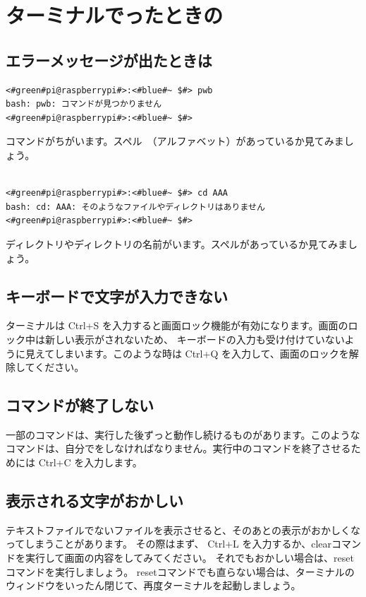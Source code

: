 \documentclass[text03.tex]{subfiles}
\begin{document}
\newpage
\section{ターミナルでったときの}

\subsection{エラーメッセージが出たときは}
\begin{lstlisting}[caption=コマンドがちがうときの例, label=cmdMiss]
<#green#pi@raspberrypi#>:<#blue#~ $#> pwb
bash: pwb: コマンドが見つかりません
<#green#pi@raspberrypi#>:<#blue#~ $#> 
\end{lstlisting}
コマンドがちがいます。スペル　（アルファベット）があっているか見てみましょう。\\\\

\begin{lstlisting}[caption=ディレクトリやファイルの名前がちがうときの例, label=nameMiss]
<#green#pi@raspberrypi#>:<#blue#~ $#> cd AAA
bash: cd: AAA: そのようなファイルやディレクトリはありません
<#green#pi@raspberrypi#>:<#blue#~ $#> 
\end{lstlisting}
ディレクトリやディレクトリの名前がいます。スペルがあっているか見てみましょう。\\

\subsection{キーボードで文字が入力できない}
ターミナルは Ctrl+S を入力すると画面ロック機能が有効になります。画面のロック中は新しい表示がされないため、
キーボードの入力も受け付けていないように見えてしまいます。このような時は Ctrl+Q を入力して、画面のロックを解除してください。

\subsection{コマンドが終了しない}
一部のコマンドは、実行した後ずっと動作し続けるものがあります。このようなコマンドは、自分でをしなければなりません。実行中のコマンドを終了させるためには Ctrl+C を入力します。

\subsection{表示される文字がおかしい}
テキストファイルでないファイルを表示させると、そのあとの表示がおかしくなってしまうことがあります。
その際はまず、 Ctrl+L を入力するか、clearコマンドを実行して画面の内容をしてみてください。
それでもおかしい場合は、reset コマンドを実行しましょう。
resetコマンドでも直らない場合は、ターミナルのウィンドウをいったん閉じて、再度ターミナルを起動しましょう。
\end{document}
